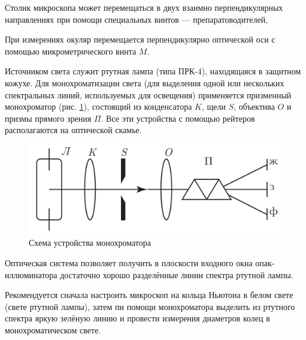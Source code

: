 \documentclass[a4paper, 12pt]{article}
\begin{document}
	Столик микроскопа может перемещаться в двух взаимно перпендикулярных направлениях при помощи специальных винтов — препаратоводителей,\par
	При измерениях окуляр перемещается перпендикулярно оптической оси с помощью микрометрического винта $M$.\par
	Источником света служит ртутная лампа (типа ПРК-4), находящаяся в защитном кожухе. Для монохроматизации света (для выделения одной или нескольких спектральных линий, используемых для освещения) применяется призменный монохроматор (рис. \ref{monochrom_scheme}), состоящий из конденсатора $K$, щели $S$, объектива $O$ и призмы прямого зрения $\Pi$. Все эти устройства с помощью рейтеров располагаются на оптической скамье.\par
	\begin{figure}
		\includegraphics[scale=0.2]{Scheme.pdf}
		\caption{Схема устройства монохроматора}
		\label{monochrom_scheme}
	\end{figure}

	Оптическая система позволяет получить в плоскости входного окна опак-иллюминатора достаточно хорошо разделённые линии спектра ртутной лампы.\par
	Рекомендуется сначала настроить микроскоп на кольца Ньютона в белом свете (свете ртутной лампы), затем пи помощи монохроматора выделить из ртутного спектра яркую зелёную линию и провести измерения диаметров колец в монохроматическом свете.
\end{document}

